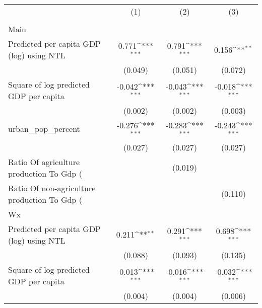 {
\def\sym#1{\ifmmode^{#1}\else\(^{#1}\)\fi}
\begin{tabular}{l*{3}{c}}
\hline\hline
                    &\multicolumn{1}{c}{(1)}&\multicolumn{1}{c}{(2)}&\multicolumn{1}{c}{(3)}\\
                    &\multicolumn{1}{c}{ }&\multicolumn{1}{c}{ }&\multicolumn{1}{c}{ }\\
\hline
Main                &                     &                     &                     \\
Predicted per capita GDP (log) using NTL&       0.771\sym{***}&       0.791\sym{***}&       0.156\sym{**} \\
                    &     (0.049)         &     (0.051)         &     (0.072)         \\
[1em]
Square of log predicted GDP per capita&      -0.042\sym{***}&      -0.043\sym{***}&      -0.018\sym{***}\\
                    &     (0.002)         &     (0.002)         &     (0.003)         \\
[1em]
urban\_pop\_percent   &      -0.276\sym{***}&      -0.283\sym{***}&      -0.243\sym{***}\\
                    &     (0.027)         &     (0.027)         &     (0.027)         \\
[1em]
Ratio Of agriculture production To Gdp (%
                    &                     &     (0.019)         &                     \\
[1em]
Ratio Of non-agriculture production To Gdp (%
                    &                     &                     &     (0.110)         \\
\hline
Wx                  &                     &                     &                     \\
Predicted per capita GDP (log) using NTL&       0.211\sym{**} &       0.291\sym{***}&       0.698\sym{***}\\
                    &     (0.088)         &     (0.093)         &     (0.135)         \\
[1em]
Square of log predicted GDP per capita&      -0.013\sym{***}&      -0.016\sym{***}&      -0.032\sym{***}\\
                    &     (0.004)         &     (0.004)         &     (0.006)         \\

\end{tabular}}
